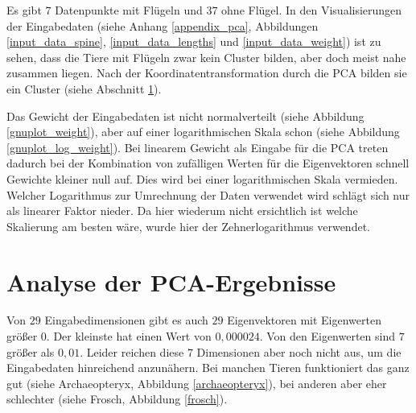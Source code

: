  Es gibt $7$ Datenpunkte mit Flügeln und $37$ ohne Flügel. In den Visualisierungen der Eingabedaten (siehe Anhang \ref{appendix_pca}, Abbildungen \ref{input_data_spine}, \ref{input_data_lengths} und \ref{input_data_weight}) ist zu sehen, dass die Tiere mit Flügeln zwar kein Cluster bilden, aber doch meist nahe zusammen liegen. Nach der Koordinatentransformation durch die PCA bilden sie ein Cluster (siehe Abschnitt \ref{section_pca_result_analysis}). 

 Das Gewicht der Eingabedaten ist nicht normalverteilt (siehe Abbildung \ref{gnuplot_weight}), aber auf einer logarithmischen Skala schon (siehe Abbildung \ref{gnuplot_log_weight}). 
 Bei linearem Gewicht als Eingabe für die PCA treten dadurch bei der Kombination von zufälligen Werten für die Eigenvektoren schnell Gewichte kleiner null auf. Dies wird bei einer logarithmischen Skala vermieden.
 Welcher Logarithmus zur Umrechnung der Daten verwendet wird schlägt sich nur als linearer Faktor nieder. Da hier wiederum nicht ersichtlich ist welche Skalierung am besten wäre, wurde hier der Zehnerlogarithmus verwendet.
 

 \section{Analyse der PCA-Ergebnisse}
 \label{section_pca_result_analysis}
 
 Von $29$ Eingabedimensionen gibt es auch $29$ Eigenvektoren mit Eigenwerten größer $0$. Der kleinste hat einen Wert von $0,000024$. Von den Eigenwerten sind $7$ größer als $0,01$. Leider reichen diese $7$ Dimensionen aber noch nicht aus, um die Eingabedaten hinreichend anzunähern. Bei manchen Tieren funktioniert das ganz gut (siehe Archaeopteryx, Abbildung \ref{archaeopteryx}), bei anderen aber eher schlechter (siehe Frosch, Abbildung \ref{frosch}).
 
